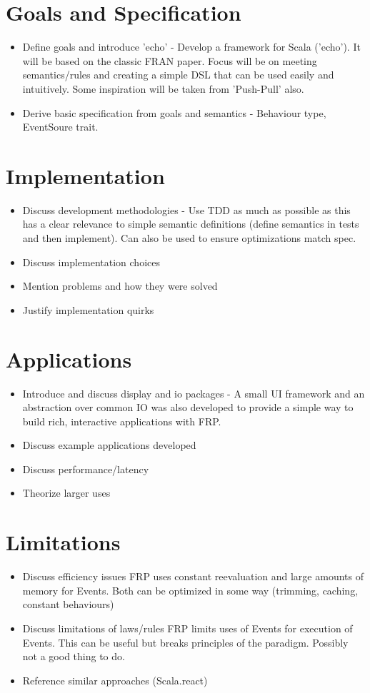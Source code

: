 \documentclass{article}
\begin{document}
  \section{Goals and Specification}
    \begin{itemize}
      \item Define goals and introduce 'echo' -
      Develop a framework for Scala ('echo'). It will be based on the classic FRAN
      paper. Focus will be on meeting semantics/rules and creating a simple DSL
      that can be used easily and intuitively. Some inspiration will be taken from
      'Push-Pull' also.
      \item Derive basic specification from goals and semantics - 
      Behaviour type, EventSoure trait.
    \end{itemize}
  \section{Implementation}
    \begin{itemize}
      \item Discuss development methodologies - 
      Use TDD as much as possible as this has a clear relevance to simple semantic
      definitions (define semantics in tests and then implement). Can also be used
      to ensure optimizations match spec.
      \item Discuss implementation choices
      \item Mention problems and how they were solved
      \item Justify implementation quirks
    \end{itemize}
  \section{Applications}
    \begin{itemize}
      \item Introduce and discuss display and io packages - 
      A small UI framework and an abstraction over common IO was also developed to
      provide a simple way to build rich, interactive applications with FRP.
      \item Discuss example applications developed
      \item Discuss performance/latency
      \item Theorize larger uses
    \end{itemize}
  \section{Limitations}
    \begin{itemize}
      \item Discuss efficiency issues
      FRP uses constant reevaluation and large amounts of memory for Events. Both
      can be optimized in some way (trimming, caching, constant behaviours)
      \item Discuss limitations of laws/rules
      FRP limits uses of Events for execution of Events. This can be useful but
      breaks principles of the paradigm. Possibly not a good thing to do.
      \item Reference similar approaches (Scala.react)
    \end{itemize}
\end{document}
